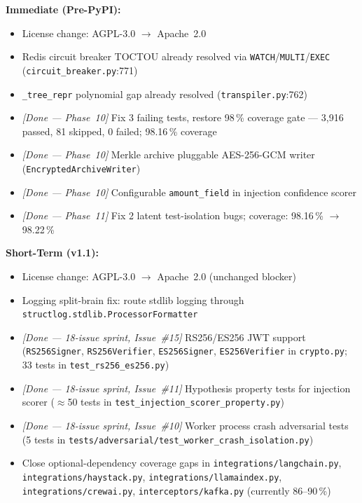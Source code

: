 \documentclass[12pt,a4paper,oneside]{report}
\newcommand{\fname}[1]{\texttt{#1}}          %
\newcommand{\code}[1]{\texttt{#1}}           %
\begin{document}
\textbf{Immediate (Pre-PyPI):}
\begin{itemize}
  \item License change: AGPL-3.0 $\to$ Apache~2.0
  \item Redis circuit breaker TOCTOU already resolved via \code{WATCH}/\code{MULTI}/\code{EXEC} (\fname{circuit\_breaker.py}:771)
  \item \code{\_tree\_repr} polynomial gap already resolved (\fname{transpiler.py}:762)
  \item \textit{[Done — Phase~10]} Fix 3 failing tests, restore 98\,\% coverage gate --- 3,916 passed, 81 skipped, 0 failed; 98.16\,\% coverage
  \item \textit{[Done — Phase~10]} Merkle archive pluggable AES-256-GCM writer (\code{EncryptedArchiveWriter})
  \item \textit{[Done — Phase~10]} Configurable \code{amount\_field} in injection confidence scorer
  \item \textit{[Done — Phase~11]} Fix 2 latent test-isolation bugs; coverage: 98.16\,\% $\to$ 98.22\,\%
\end{itemize}

\textbf{Short-Term (v1.1):}
\begin{itemize}
  \item License change: AGPL-3.0 $\to$ Apache~2.0 (unchanged blocker)
  \item Logging split-brain fix: route stdlib logging through
        \code{structlog.stdlib.ProcessorFormatter}
  \item \textit{[Done --- 18-issue sprint, Issue~\#15]} RS256/ES256 JWT support
        (\code{RS256Signer}, \code{RS256Verifier}, \code{ES256Signer},
        \code{ES256Verifier} in \fname{crypto.py}; 33 tests in
        \fname{test\_rs256\_es256.py})
  \item \textit{[Done --- 18-issue sprint, Issue~\#11]} Hypothesis property
        tests for injection scorer ($\approx$50 tests in
        \fname{test\_injection\_scorer\_property.py})
  \item \textit{[Done --- 18-issue sprint, Issue~\#10]} Worker process crash
        adversarial tests (5 tests in
        \fname{tests/adversarial/test\_worker\_crash\_isolation.py})
  \item Close optional-dependency coverage gaps in
        \fname{integrations/langchain.py},
        \fname{integrations/haystack.py},
        \fname{integrations/llamaindex.py},
        \fname{integrations/crewai.py},
        \fname{interceptors/kafka.py} (currently 86--90\,\%)
\end{itemize}
\end{document}
